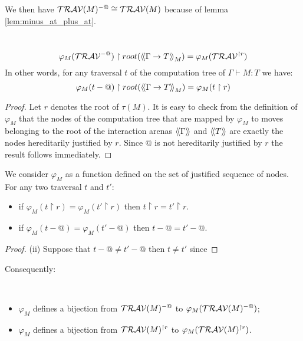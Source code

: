 We then have $\mathcal{TRAV}(M)^{-@} \cong \mathcal{TRAV}(M)$ because of lemma \ref{lem:minus_at_plus_at}.

\begin{lem} \
\label{lem:varphi_filter}
$$ \varphi_M(\mathcal{TRAV}^{-@}) \upharpoonright root({\langle\!\langle \Gamma \rightarrow T \rangle\!\rangle}_M) = \varphi_M(\mathcal{TRAV}^{\upharpoonright r}) $$
In other words, for any traversal $t$ of the computation tree of $\Gamma \vdash M :T$ we have:
$$\varphi_M(t-@) \upharpoonright root({\langle\!\langle \Gamma \rightarrow T \rangle\!\rangle}_M) = \varphi_M(t\upharpoonright r)$$
\end{lem}
\begin{proof}
    Let $r$ denotes the root of $\tau(M)$.
    It is easy to check from the definition of $\varphi_M$ that the nodes of the computation tree that are mapped by $\varphi_M$
    to moves belonging to the root of the interaction arenas ${\langle\!\langle \Gamma \rangle\!\rangle}$ and ${\langle\!\langle T \rangle\!\rangle}$ are
    exactly the nodes hereditarily justified by $r$.
    Since $@$ is not hereditarily justified by $r$ the result follows immediately.
\end{proof}


\begin{lem}
We consider $\varphi_M$ as a function defined on the set of
justified sequence of nodes. For any two traversal $t$ and $t'$:
\begin{itemize}
\item[(i)] if $\varphi_M (t \upharpoonright r ) = \varphi_M (t' \upharpoonright r )$ then $t\upharpoonright r = t'\upharpoonright r$.
\item[(ii)] if $\varphi_M (t - @ ) = \varphi_M (t' - @ )$ then $t-@ =t' -@$.
\end{itemize}
\end{lem}
\begin{proof}
(ii) Suppose that $t-@ \neq t'-@$ then $t\neq t'$ since


\end{proof}

Consequently:
\begin{cor} \
\label{cor:varphi_bij}
\begin{itemize}
\item[(i)] $\varphi_M$ defines a bijection from $\mathcal{TRAV}(M)^{-@}$
to $\varphi_M(\mathcal{TRAV}(M)^{-@})$;
\item[(ii)] $\varphi_M$ defines a bijection from $\mathcal{TRAV}(M)^{\upharpoonright r}$ to
$\varphi_M(\mathcal{TRAV}(M)^{\upharpoonright r})$.
\end{itemize}
\end{cor}






